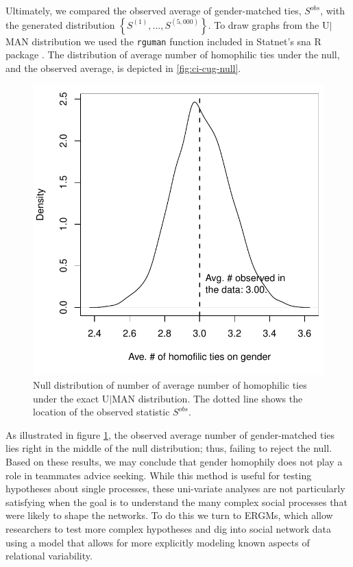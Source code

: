 \documentclass[]{article}
\begin{document}
Ultimately, we compared the observed average of gender-matched ties, $S^{obs}$, with the generated distribution $\left\{S^{(1)}, \dots, S^{(5,000)}\right\}$. To draw graphs from the U$|$MAN distribution we used the \texttt{rguman} function included in Statnet's sna R package \cite{butts2016}. The distribution of average number of homophilic ties under the null, and the observed average, is depicted in \autoref{fig:ci-cug-null}.
 
\begin{figure}[tb]
    \centering
    \includegraphics[width=.7\linewidth]{figures/ci-cug-test.pdf}
    \caption{Null distribution of number of average number of homophilic ties under the exact U$|$MAN distribution. The dotted line shows the location of the observed statistic $S^{obs}$.}
    \label{fig:ci-cug-null}
\end{figure}

As illustrated in figure \ref{fig:ci-cug-null}, the observed average number of gender-matched ties lies right in the middle of the null distribution; thus, failing to reject the null. Based on these results, we may conclude that gender homophily does not play a role in teammates advice seeking. While this method is useful for testing hypotheses about single processes, these uni-variate analyses are not particularly satisfying when the goal is to understand the many complex social processes that were likely to shape the networks. To do this we turn to ERGMs, which allow researchers to test more complex hypotheses and dig into social network data using a model that allows for more explicitly modeling known aspects of relational variability.
\end{document}
